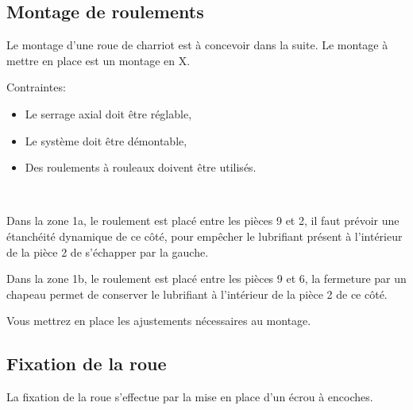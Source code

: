 

\subsection{Montage de roulements}
 
Le montage d'une roue de charriot est à concevoir dans la suite. Le montage à mettre en place est un montage en X.

Contraintes:\\
\begin{itemize}
 \item Le serrage axial doit être réglable,
 \item Le système doit être démontable,
 \item Des roulements à rouleaux doivent être utilisés.
\end{itemize}


~\

Dans la zone 1a, le roulement est placé entre les pièces 9 et 2, il faut prévoir une étanchéité dynamique de ce côté, pour empêcher le lubrifiant présent à l'intérieur de la pièce 2 de s'échapper par la gauche.

Dans la zone 1b, le roulement est placé entre les pièces 9 et 6, la fermeture par un chapeau permet de conserver le lubrifiant à l'intérieur de la pièce 2 de ce côté.

Vous mettrez en place les ajustements nécessaires au montage.

\subsection{Fixation de la roue}

La fixation de la roue s'effectue par la mise en place d'un écrou à encoches.


\finsujet



